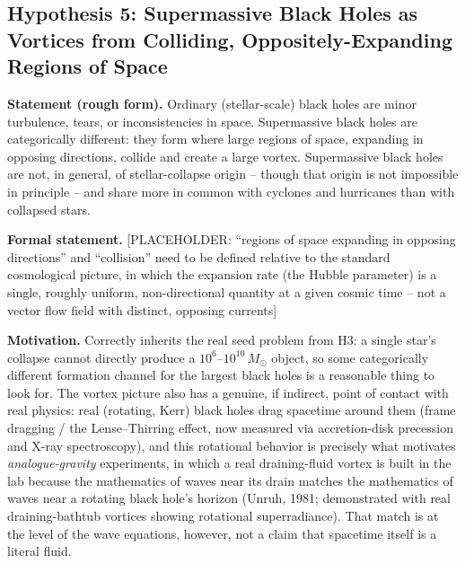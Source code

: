 \documentclass[12pt, a4paper]{article}
\begin{document}
\subsection{Hypothesis 5: Supermassive Black Holes as Vortices from Colliding, Oppositely-Expanding Regions of Space}
\label{subsec:h5}
\textbf{Statement (rough form).} Ordinary (stellar-scale) black holes
are minor turbulence, tears, or inconsistencies in space. Supermassive
black holes are categorically different: they form where large
regions of space, expanding in opposing directions, collide and
create a large vortex. Supermassive black holes are not, in general,
of stellar-collapse origin -- though that origin is not impossible in
principle -- and share more in common with cyclones and hurricanes
than with collapsed stars.

\textbf{Formal statement.}
[PLACEHOLDER: ``regions of space expanding in opposing directions''
and ``collision'' need to be defined relative to the standard
cosmological picture, in which the expansion rate (the Hubble
parameter) is a single, roughly uniform, non-directional quantity at
a given cosmic time -- not a vector flow field with distinct, opposing
currents]

\textbf{Motivation.} Correctly inherits the real seed problem from H3:
a single star's collapse cannot directly produce a $10^6$--$10^{10}
\,M_\odot$ object, so some categorically different formation channel
for the largest black holes is a reasonable thing to look for. The
vortex picture also has a genuine, if indirect, point of contact with
real physics: real (rotating, Kerr) black holes drag spacetime around
them (frame dragging / the Lense--Thirring effect, now measured via
accretion-disk precession and X-ray spectroscopy), and this rotational
behavior is precisely what motivates \emph{analogue-gravity}
experiments, in which a real draining-fluid vortex is built in the lab
because the mathematics of waves near its drain matches the
mathematics of waves near a rotating black hole's horizon (Unruh,
1981; demonstrated with real draining-bathtub vortices showing
rotational superradiance). That match is at the level of the wave
equations, however, not a claim that spacetime itself is a literal
fluid.
\end{document}

